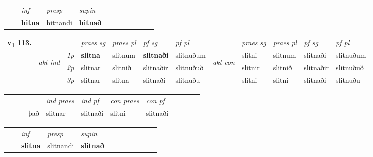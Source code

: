 \begin{tabular}{llllllllllll}
 & & \textit{inf}     & \textit{presp} & \textit{supin}       \\*
  & & \textbf{hitna}      & hitnandi &  \textbf{hitnað}   \\*
\cmidrule{1-12}
\end{tabular}



\begin{tabular}{llllllllllll} \toprule
\multirow{4}{*}{{{\textbf{v{\textsubscript{1}}} \Large{\textbf{113.}}}}}  & &   &  \textit{praes sg}  & \textit{praes pl}  &\textit{ pf sg} & \textit{pf pl} &  &  \textit{praes sg}  & \textit{praes pl}  & \textit{pf sg} & \textit{pf pl } \\*
	\cmidrule{4-7} \cmidrule{9-12}
 & \multirow{3}{*}{\begin{turn}{90}\textit{akt ind}\end{turn}} & {\textit{1p}} & \textbf{slitna} & slitnum    & \textbf{slitnaði} & slitnuðum & \multirow{3}{*}{\begin{turn}{90}\textit{akt con}\end{turn}} &slitni & slitnum & slitnaði & slitnuðum\\*
& &  {\textit{2p}} &  slitnar  & slitnið   & slitnaðir & slitnuðuð & & slitnir & slitnið & slitnaðir & slitnuðuð \\*
& &  {\textit{3p}} & slitnar & slitna   & slitnaði & slitnuðu & & slitni & slitni& slitnaði & slitnuðu  \\*
\cmidrule{4-7} \cmidrule{9-12}
\end{tabular}


\begin{tabular}{llllllllllll}
 & &  & &  \textit{ind praes} & \textit{ind pf} & \textit{con praes} & \textit{con pf} \\*
&  & & það & slitnar & slitnaði & slitni & slitnaði \\*
\cmidrule{5-9}
\end{tabular}


\begin{tabular}{llllllllllll}
 & & \textit{inf}     & \textit{presp} & \textit{supin}       \\*
  & & \textbf{slitna}      & slitnandi &  \textbf{slitnað}   \\*
\cmidrule{1-12}
\end{tabular}



